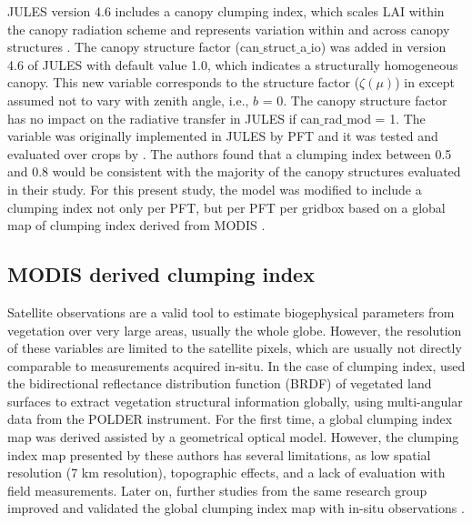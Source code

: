 JULES version 4.6 includes a canopy clumping index, which scales LAI within the canopy radiation scheme and represents variation within and across canopy structures \citep{Williams2017}. The canopy structure factor (can$\_$struct$\_$a$\_$io) was added in version 4.6 of JULES with default value 1.0, which indicates a structurally homogeneous canopy. This new variable corresponds to the structure factor ($\zeta(\mu)$) in \citet{pinty2006} except assumed not to vary with zenith angle, i.e., $b$ = 0. The canopy structure factor has no impact on the radiative transfer in JULES if can$\_$rad$\_$mod = 1. The variable was originally implemented in JULES by PFT and it was tested and evaluated over crops by \citet{Williams2017}. The authors found that a clumping index between 0.5 and 0.8 would be consistent with the majority of the canopy structures evaluated in their study. For this present study, the model was modified to include a clumping index not only per PFT, but per PFT per gridbox based on a global map of clumping index derived from MODIS \citep{He2012}.

\subsection{MODIS derived clumping index}


Satellite observations are a valid tool to estimate biogephysical parameters from vegetation over very large areas, usually the whole globe. However, the resolution of these variables are limited to the satellite pixels, which are usually not directly comparable to measurements acquired in-situ. In the case of clumping index, \citep{Chen2005} used the bidirectional reflectance distribution function (BRDF) of vegetated land surfaces to extract vegetation structural information globally, using multi-angular data from the POLDER instrument. For the first time, a global clumping index map was derived assisted by a geometrical optical model. However, the clumping index map presented by these authors has several limitations, as low spatial resolution (7 km resolution), topographic effects, and a lack of evaluation with field measurements. Later on, further studies from the same research group improved and validated the global clumping index map with in-situ observations \citep{Pisek2010}.

